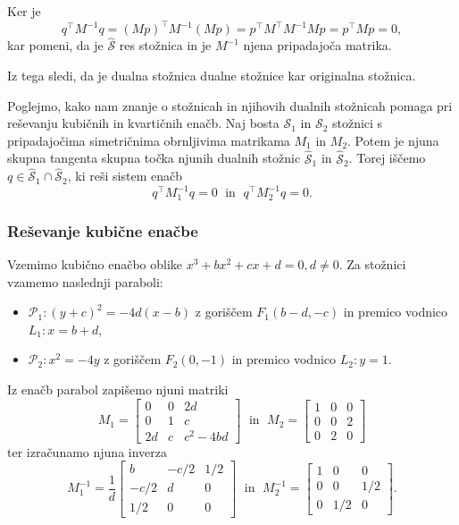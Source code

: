 Ker je
$$ q^\intercal M^{-1} q = (Mp)^\intercal M^{-1} (Mp) = p^\intercal M^\intercal M^{-1} M p = p^\intercal M p = 0,$$
kar pomeni, da je $\mathcal{\hat{S}}$ res stožnica in je $M^{-1}$ njena pripadajoča matrika.

\begin{opomba}
    Iz tega sledi, da je dualna stožnica dualne stožnice kar originalna stožnica.
\end{opomba}

Poglejmo, kako nam znanje o stožnicah in njihovih dualnih stožnicah pomaga pri reševanju kubičnih in kvartičnih enačb. Naj bosta $\mathcal{S}_1$ in $\mathcal{S}_2$ stožnici s pripadajočima simetričnima obrnljivima matrikama $M_1$ in $M_2$. Potem je njuna skupna tangenta skupna točka njunih dualnih stožnic $\mathcal{\hat{S}}_1$ in $\mathcal{\hat{S}}_2$. Torej iščemo $q \in \mathcal{\hat{S}}_1 \cap \mathcal{\hat{S}}_2$, ki reši sistem enačb
\begin{equation}
    \label{eq:afin_sistem_tangenta_splosen}
    q^\intercal M^{-1}_1 q = 0 \; \text{ in } \; q^\intercal M^{-1}_2 q = 0.
\end{equation}

\subsubsection*{Reševanje kubične enačbe}

Vzemimo kubično enačbo oblike $ x^3 + bx^2 + cx + d = 0, d \neq 0$. Za stožnici vzamemo naslednji paraboli:
\begin{itemize}
    \item $\mathcal{P}_1: (y+c)^2 = -4d(x-b)$ z goriščem $F_1 (b - d, -c)$ in premico vodnico $L_1: x = b + d$,
    \item $\mathcal{P}_2: x^2 = -4y$ z goriščem $F_2 (0, -1)$ in premico vodnico $L_2: y = 1$.
\end{itemize}

Iz enačb parabol zapišemo njuni matriki
$$ M_1 =
    \begin{bmatrix}
        0 & 0 & 2d\\
        0 & 1 & c\\
        2d & c & c^2-4bd
    \end{bmatrix}
    \; \text{ in } \; M_2 =
    \begin{bmatrix}
        1 & 0 & 0\\
        0 & 0 & 2\\
        0 & 2 & 0
    \end{bmatrix}
$$
ter izračunamo njuna inverza
$$ M^{-1}_1 = \frac{1}{d}
    \begin{bmatrix}
        b & -c/2 & 1/2\\
        -c/2 & d & 0\\
        1/2 & 0 & 0
    \end{bmatrix}
\; \text{ in } \; M^{-1}_2 =
    \begin{bmatrix}
        1 & 0 & 0\\
        0 & 0 & 1/2\\
        0 & 1/2 & 0
    \end{bmatrix}.
$$

